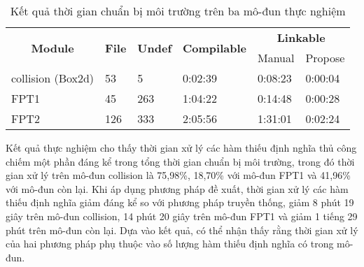 \begin{table}[h]
    \centering
    \caption{Kết quả thời gian chuẩn bị môi trường trên ba mô-đun thực nghiệm}
    \label{tab:time_undef}
\begin{tabular}{|l|l|l|l|ll|}
\hline
\multicolumn{1}{|c|}{\multirow{2}{*}{\textbf{Module}}} & \multicolumn{1}{c|}{\multirow{2}{*}{\textbf{File}}} & \multicolumn{1}{c|}{\multirow{2}{*}{\textbf{Undef}}} & \multirow{2}{*}{\textbf{Compilable}} & \multicolumn{2}{c|}{\textbf{Linkable}} \\ \cline{5-6} 
\multicolumn{1}{|c|}{}                                 & \multicolumn{1}{c|}{}                               & \multicolumn{1}{c|}{}                                &                                      & \multicolumn{1}{l|}{Manual}  & Propose \\ \hline
collision (Box2d)                                      & 53                                                  & 5                                                    & 0:02:39                              & \multicolumn{1}{l|}{0:08:23} & 0:00:04 \\ \hline
FPT1                                     & 45                                                  & 263                                                  & 1:04:22                              & \multicolumn{1}{l|}{0:14:48} & 0:00:28 \\ \hline
FPT2                                          & 126                                                 & 333                                                  & 2:05:56                              & \multicolumn{1}{l|}{1:31:01} & 0:02:24 \\ \hline
\end{tabular}
\end{table}

Kết quả thực nghiệm cho thấy thời gian xử lý các hàm thiếu định nghĩa thủ công chiếm một phần đáng kể trong tổng thời gian chuẩn bị môi trường, trong đó thời gian xử lý trên mô-đun collision là 75,98\%, 18,70\% với mô-đun FPT1 và 41,96\% với mô-đun còn lại. Khi áp dụng phương pháp đề xuất, thời gian xử lý các hàm thiếu định nghĩa giảm đáng kể so với phương pháp truyền thống, giảm 8 phút 19 giây trên mô-đun collision, 14 phút 20 giây trên mô-đun FPT1 và giảm 1 tiếng 29 phút trên mô-đun còn lại. Dựa vào kết quả, có thể nhận thấy rằng thời gian xử lý của hai phương pháp phụ thuộc vào số lượng hàm thiếu định nghĩa có trong mô-đun.


